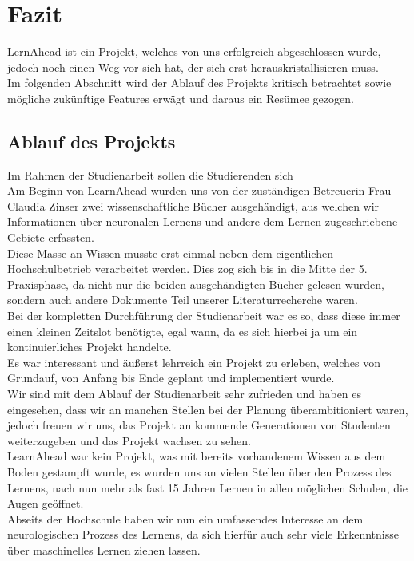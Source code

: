 \section{Fazit}
LernAhead ist ein Projekt, welches von uns erfolgreich abgeschlossen wurde, jedoch noch einen Weg vor sich hat, der sich erst herauskristallisieren muss.\\
Im folgenden Abschnitt wird der Ablauf des Projekts kritisch betrachtet sowie mögliche zukünftige Features erwägt und daraus ein Resümee gezogen.\\
\subsection{Ablauf des Projekts}
Im Rahmen der Studienarbeit sollen die Studierenden sich \cite{DHBW_Studienarbeit}\\
Am Beginn von LearnAhead wurden uns von der zuständigen Betreuerin Frau Claudia Zinser zwei wissenschaftliche Bücher ausgehändigt, aus welchen wir Informationen über neuronalen Lernens und andere dem Lernen zugeschriebene Gebiete erfassten.\\
Diese Masse an Wissen musste erst einmal neben dem eigentlichen Hochschulbetrieb verarbeitet werden. Dies zog sich bis in die Mitte der 5. Praxisphase, da nicht nur die beiden ausgehändigten Bücher gelesen wurden, sondern auch andere Dokumente Teil unserer Literaturrecherche waren.\\
Bei der kompletten Durchführung der Studienarbeit war es so, dass diese immer einen kleinen Zeitslot benötigte, egal wann, da es sich hierbei ja um ein kontinuierliches Projekt handelte.\\
Es war interessant und äußerst lehrreich ein Projekt zu erleben, welches von Grundauf, von Anfang bis Ende geplant und implementiert wurde.\\
Wir sind mit dem Ablauf der Studienarbeit sehr zufrieden und haben es eingesehen, dass wir an manchen Stellen bei der Planung überambitioniert waren, jedoch freuen wir uns, das Projekt an kommende Generationen von Studenten weiterzugeben und das Projekt wachsen zu sehen.\\
LearnAhead war kein Projekt, was mit bereits vorhandenem Wissen aus dem Boden gestampft wurde, es wurden uns an vielen Stellen über den Prozess des Lernens, nach nun mehr als fast 15 Jahren Lernen in allen möglichen Schulen, die Augen geöffnet.\\ 
Abseits der Hochschule haben wir nun ein umfassendes Interesse an dem neurologischen Prozess des Lernens, da sich hierfür auch sehr viele Erkenntnisse über maschinelles Lernen ziehen lassen. \\
